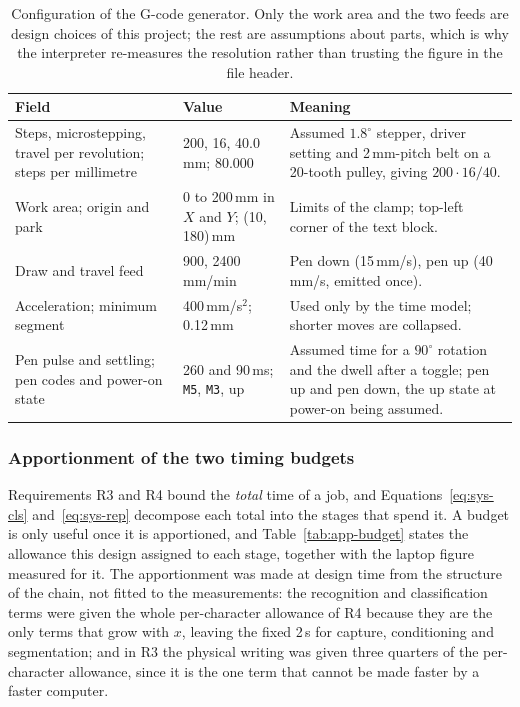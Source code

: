 \begin{table}[!htbp]
\centering
\fontsize{8}{9.6}\selectfont
\setlength{\tabcolsep}{4pt}
\begin{tabularx}{\linewidth}{|p{3.4cm}|p{2.4cm}|X|}
\hline
\textbf{Field} & \textbf{Value} & \textbf{Meaning} \\
\hline
Steps, microstepping, travel per revolution; steps per millimetre & 200, 16, 40.0\,mm; 80.000 & Assumed $1.8^\circ$ stepper, driver setting and 2\,mm-pitch belt on a 20-tooth pulley, giving $200\cdot16/40$. \\
Work area; origin and park & 0 to 200\,mm in $X$ and $Y$; (10, 180)\,mm & Limits of the clamp; top-left corner of the text block. \\
Draw and travel feed & 900, 2400\,mm/min & Pen down (15\,mm/s), pen up (40\,mm/s, emitted once). \\
Acceleration; minimum segment & 400\,mm/s$^2$; 0.12\,mm & Used only by the time model; shorter moves are collapsed. \\
Pen pulse and settling; pen codes and power-on state & 260 and 90\,ms; \texttt{M5}, \texttt{M3}, up & Assumed time for a $90^\circ$ rotation and the dwell after a toggle; pen up and pen down, the up state at power-on being assumed. \\
\hline
\end{tabularx}
\caption{Configuration of the G-code generator. Only the work area and the two feeds are design choices of this project; the rest are assumptions about parts, which is why the interpreter re-measures the resolution rather than trusting the figure in the file header.}
\label{tab:gc-config}
\end{table}

\subsubsection{Apportionment of the two timing budgets}

Requirements R3 and R4 bound the \emph{total} time of a job, and Equations~\ref{eq:sys-cls} and~\ref{eq:sys-rep} decompose each total into the stages that spend it.
A budget is only useful once it is apportioned, and Table~\ref{tab:app-budget} states the allowance this design assigned to each stage, together with the laptop figure measured for it.
The apportionment was made at design time from the structure of the chain, not fitted to the measurements: the recognition and classification terms were given the whole per-character allowance of R4 because they are the only terms that grow with $x$, leaving the fixed 2\,s for capture, conditioning and segmentation; and in R3 the physical writing was given three quarters of the per-character allowance, since it is the one term that cannot be made faster by a faster computer.

